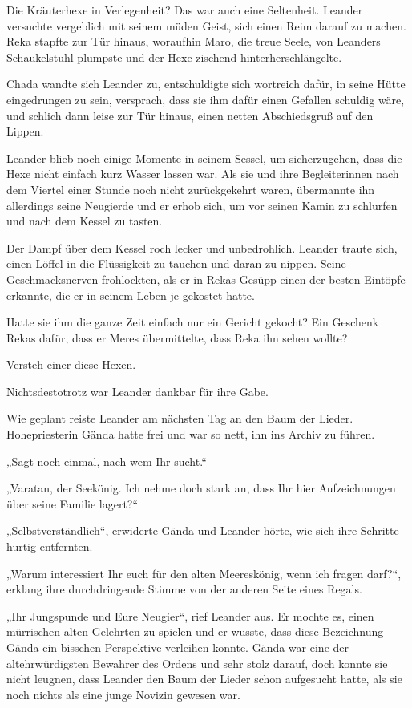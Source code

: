 \documentclass[10pt, a4paper, oneside]{book}
\begin{document}
Die Kräuterhexe in Verlegenheit? Das war auch eine Seltenheit. Leander versuchte vergeblich mit seinem müden Geist, sich einen Reim darauf zu machen. Reka stapfte zur Tür hinaus, woraufhin Maro, die treue Seele, von Leanders Schaukelstuhl plumpste und der Hexe zischend hinterherschlängelte.

Chada wandte sich Leander zu, entschuldigte sich wortreich dafür, in seine Hütte eingedrungen zu sein, versprach, dass sie ihm dafür einen Gefallen schuldig wäre, und schlich dann leise zur Tür hinaus, einen netten Abschiedsgruß auf den Lippen.

Leander blieb noch einige Momente in seinem Sessel, um sicherzugehen, dass die Hexe nicht einfach kurz Wasser lassen war. Als sie und ihre Begleiterinnen nach dem Viertel einer Stunde noch nicht zurückgekehrt waren, übermannte ihn allerdings seine Neugierde und er erhob sich, um vor seinen Kamin zu schlurfen und nach dem Kessel zu tasten.

Der Dampf über dem Kessel roch lecker und unbedrohlich. Leander traute sich, einen Löffel in die Flüssigkeit zu tauchen und daran zu nippen. Seine Geschmacksnerven frohlockten, als er in Rekas Gesüpp einen der besten Eintöpfe erkannte, die er in seinem Leben je gekostet hatte.

Hatte sie ihm die ganze Zeit einfach nur ein Gericht gekocht? Ein Geschenk Rekas dafür, dass er Meres übermittelte, dass Reka ihn sehen wollte?

Versteh einer diese Hexen.

Nichtsdestotrotz war Leander dankbar für ihre Gabe.\bigskip







Wie geplant reiste Leander am nächsten Tag an den Baum der Lieder. Hohepriesterin Gända hatte frei und war so nett, ihn ins Archiv zu führen.

„Sagt noch einmal, nach wem Ihr sucht.“

„Varatan, der Seekönig. Ich nehme doch stark an, dass Ihr hier Aufzeichnungen über seine Familie lagert?“

„Selbstverständlich“, erwiderte Gända und Leander hörte, wie sich ihre Schritte hurtig entfernten.

„Warum interessiert Ihr euch für den alten Meereskönig, wenn ich fragen darf?“, erklang ihre durchdringende Stimme von der anderen Seite eines Regals.

„Ihr Jungspunde und Eure Neugier“, rief Leander aus. Er mochte es, einen mürrischen alten Gelehrten zu spielen und er wusste, dass diese Bezeichnung Gända ein bisschen Perspektive verleihen konnte. Gända war eine der altehrwürdigsten Bewahrer des Ordens und sehr stolz darauf, doch konnte sie nicht leugnen, dass Leander den Baum der Lieder schon aufgesucht hatte, als sie noch nichts als eine junge Novizin gewesen war.
\end{document}
